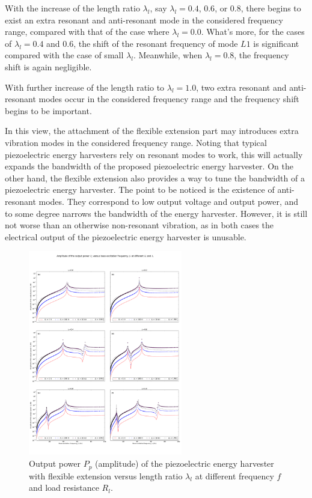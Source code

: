 \documentclass{elsarticle}
\begin{document}
With the increase of the length ratio $\lambda_l$, say $\lambda_l = 0.4$, $0.6$, or $0.8$, there begins to exist an extra resonant and anti-resonant mode in the considered frequency range, compared with that of the case where $\lambda_l = 0.0$. What's more, for the cases of $\lambda_l = 0.4$ and $0.6$, the shift of the resonant frequency of mode $L1$ is significant compared with the case of small $\lambda_l$. Meanwhile, when $\lambda_l = 0.8$, the frequency shift is again negligible. 

With further increase of the length ratio to $\lambda_l = 1.0$, two extra resonant and anti-resonant modes occur in the considered frequency range and the frequency shift begins to be important. 

In this view, the attachment of the flexible extension part may introduces extra vibration modes in the considered frequency range. Noting that typical piezoelectric energy harvesters rely on resonant modes to work, this will actually expands the bandwidth of the proposed piezoelectric energy harvester. On the other hand, the flexible extension also provides a way to tune the bandwidth of a piezoelectric energy harvester. The point to be noticed is the existence of anti-resonant modes. They correspond to low output voltage and output power, and to some degree narrows the bandwidth of the energy harvester. However, it is still not worse than an otherwise non-resonant vibration, as in both cases the electrical output of the piezoelectric energy harvester is unusable.


\begin{figure}[!htbp]
    \centering
    \includegraphics[width=0.6\textwidth]{./fig_output_power_vs_fr_Rl_laml_all}
    \caption{Output power $P_p$ (amplitude) of the piezoelectric energy harvester with flexible extension versus length ratio $\lambda_l$ at different frequency $f$ and load resistance $R_l$. }
    \label{fig:fig_output_power_vs_fr_Rl_laml_all}
\end{figure}
\end{document}
